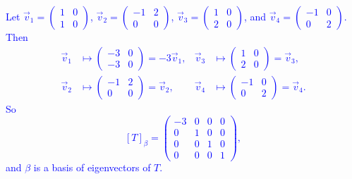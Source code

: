 \documentclass[a4paper,11pt]{article}
\newcommand{\blue}[1]{\textcolor{blue}{#1}}
\begin{document}
\begin{enumerate}[(a)]
     \blue{Let $\vec v_1=\left( \begin{smallmatrix}1&0\\1&0\end{smallmatrix}
       \right)$, $\vec v_2=\left( \begin{smallmatrix}-1&2\\0&0\end{smallmatrix}
       \right)$, $\vec v_3=\left( \begin{smallmatrix}1&0\\2&0\end{smallmatrix}
       \right)$, and $\vec
       v_4=\left( \begin{smallmatrix}-1&0\\0&2\end{smallmatrix} \right)$. Then
       \begin{align*}
         \vec v_1 &\mapsto
         \left(
         \begin{array}{rr}
           -3&0\\-3&0
         \end{array}
         \right) = -3\vec v_1,
         &
         \vec v_3 &\mapsto
         \left(
         \begin{array}{rr}
           1&0\\2&0
         \end{array}
         \right) = \vec v_3, \\
         \vec v_2 &\mapsto
         \left(
         \begin{array}{rr}
           -1&2\\0&0
         \end{array}
         \right) = \vec v_2,
         &
         \vec v_4 &\mapsto
         \left(
         \begin{array}{rr}
           -1&0\\0&2
         \end{array}
         \right) = \vec v_4.
       \end{align*}
       So
       \[
         [T]_\beta =
         \left(
           \begin{array}{rrrr}
             -3&0&0&0\\
             0&1&0&0\\
             0&0&1&0\\
             0&0&0&1
           \end{array}
         \right),
       \]
       and $\beta$ is a basis of eigenvectors of $T$. \\}
\end{enumerate}
\end{document}
